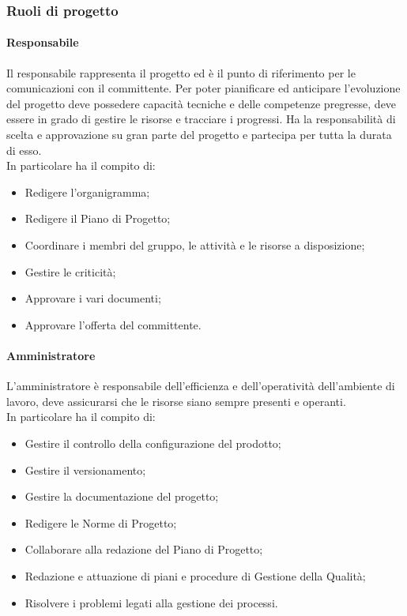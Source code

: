 \documentclass[../norme_di_progetto.tex]{subfiles}
\begin{document}
    \subsubsection{Ruoli di progetto}
        \paragraph{Responsabile}
        Il responsabile rappresenta il progetto ed è il punto di riferimento per le comunicazioni con il committente. Per poter pianificare ed anticipare l'evoluzione del progetto deve possedere capacità tecniche e delle competenze pregresse, deve essere in grado di gestire le risorse e tracciare i progressi. Ha la responsabilità di scelta e approvazione su gran parte del progetto e partecipa per tutta la durata di esso.\\
        In particolare ha il compito di:
        \begin{itemize}
            \item Redigere l'organigramma;
            \item Redigere il Piano di Progetto;
            \item Coordinare i membri del gruppo, le attività e le risorse a disposizione;
            \item Gestire le criticità;
            \item Approvare i vari documenti;
            \item Approvare l'offerta del committente.
        \end{itemize}

        \paragraph{Amministratore}
        L'amministratore è responsabile dell'efficienza e dell'operatività dell'ambiente di lavoro, deve assicurarsi che le risorse siano sempre presenti e operanti.\\
        In particolare ha il compito di:
        \begin{itemize}
            \item Gestire il controllo della configurazione del prodotto;
            \item Gestire il versionamento;
            \item Gestire la documentazione del progetto;
            \item Redigere le Norme di Progetto;
            \item Collaborare alla redazione del Piano di Progetto;
            \item Redazione e attuazione di piani e procedure di Gestione della Qualità;
            \item Risolvere i problemi legati alla gestione dei processi.
        \end{itemize}
        
\end{document}
